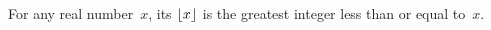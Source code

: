 \documentclass{ibl}  %
\begin{document}
\begin{problem}
\end{problem}

\begin{df}
For any real number~$x$,
its  $\lfloor x \rfloor$ is
the greatest integer less than or equal to~$x$.  
\end{df}
\end{document}

